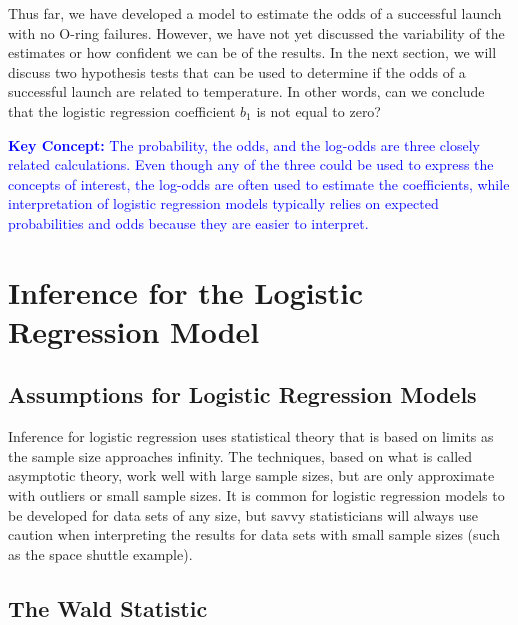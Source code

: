 \documentclass[
]{book}
\begin{document}
Thus far, we have developed a model to estimate the odds of a successful launch with no O-ring failures. However, we have not yet discussed the variability of the estimates or how confident we can be of the results. In the next section, we will discuss two hypothesis tests that can be used to determine if the odds of a successful launch are related to temperature. In other words, can we conclude that the logistic regression coefficient \(b_1\) is not equal to zero?

\textbf{\textcolor{blue}{Key Concept:}} \textcolor{blue}{The probability, the odds, and the log-odds are three closely related calculations. Even though any of the three could be used to express the concepts of interest, the log-odds are often used to estimate the coefficients, while interpretation of logistic regression models typically relies on expected probabilities and odds because they are easier to interpret.}

\hypertarget{inference-for-the-logistic-regression-model}{%
\section{Inference for the Logistic Regression Model}\label{inference-for-the-logistic-regression-model}}

\hypertarget{assumptions-for-logistic-regression-models}{%
\subsection*{Assumptions for Logistic Regression Models}\label{assumptions-for-logistic-regression-models}}

Inference for logistic regression uses statistical theory that is based on limits as the sample size approaches infinity. The techniques, based on what is called asymptotic theory, work well with large sample sizes, but are only approximate with outliers or small sample sizes. It is common for logistic regression models to be developed for data sets of any size, but savvy statisticians will always use caution when interpreting the results for data sets with small sample sizes (such as the space shuttle example).

\hypertarget{the-wald-statistic}{%
\subsection*{The Wald Statistic}\label{the-wald-statistic}}
\end{document}
